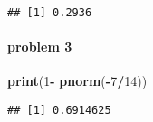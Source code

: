 \documentclass[]{article}
\newenvironment{Shaded}{\begin{snugshade}}{\end{snugshade}}
\newcommand{\KeywordTok}[1]{\textcolor[rgb]{0.13,0.29,0.53}{\textbf{#1}}}
\newcommand{\DecValTok}[1]{\textcolor[rgb]{0.00,0.00,0.81}{#1}}
\newcommand{\StringTok}[1]{\textcolor[rgb]{0.31,0.60,0.02}{#1}}
\newcommand{\OperatorTok}[1]{\textcolor[rgb]{0.81,0.36,0.00}{\textbf{#1}}}
\newcommand{\NormalTok}[1]{#1}
\let\oldparagraph\paragraph
\renewcommand{\paragraph}[1]{\oldparagraph{#1}\mbox{}}
\begin{document}
\begin{verbatim}
## [1] 0.2936
\end{verbatim}

\paragraph{problem 3}\label{problem-3}

\begin{Shaded}
\begin{Highlighting}[]
\KeywordTok{print}\NormalTok{(}\DecValTok{1}\OperatorTok{-}\StringTok{ }\KeywordTok{pnorm}\NormalTok{(}\OperatorTok{-}\DecValTok{7}\OperatorTok{/}\DecValTok{14}\NormalTok{))}
\end{Highlighting}
\end{Shaded}

\begin{verbatim}
## [1] 0.6914625
\end{verbatim}
\end{document}
